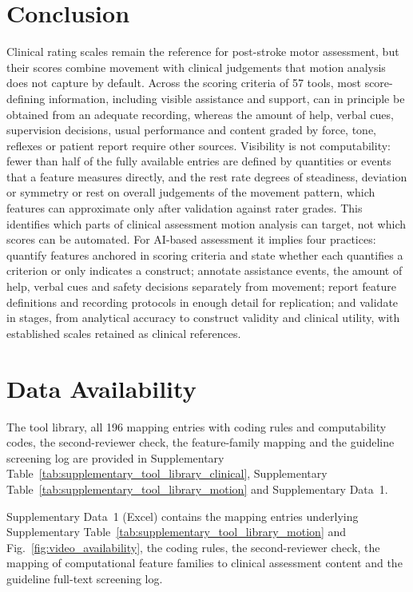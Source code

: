 \documentclass[11pt]{article}
\begin{document}
\section{Conclusion}

Clinical rating scales remain the reference for post-stroke motor assessment, but their scores combine movement with clinical judgements that motion analysis does not capture by default. Across the scoring criteria of 57 tools, most score-defining information, including visible assistance and support, can in principle be obtained from an adequate recording, whereas the amount of help, verbal cues, supervision decisions, usual performance and content graded by force, tone, reflexes or patient report require other sources. Visibility is not computability: fewer than half of the fully available entries are defined by quantities or events that a feature measures directly, and the rest rate degrees of steadiness, deviation or symmetry or rest on overall judgements of the movement pattern, which features can approximate only after validation against rater grades. This identifies which parts of clinical assessment motion analysis can target, not which scores can be automated. For AI-based assessment it implies four practices: quantify features anchored in scoring criteria and state whether each quantifies a criterion or only indicates a construct; annotate assistance events, the amount of help, verbal cues and safety decisions separately from movement; report feature definitions and recording protocols in enough detail for replication; and validate in stages, from analytical accuracy to construct validity and clinical utility, with established scales retained as clinical references.

\section*{Data Availability}
The tool library, all 196 mapping entries with coding rules and computability codes, the second-reviewer check, the feature-family mapping and the guideline screening log are provided in Supplementary Table~\ref{tab:supplementary_tool_library_clinical}, Supplementary Table~\ref{tab:supplementary_tool_library_motion} and Supplementary Data~1.

\printbibliography




\noindent Supplementary Data~1 (Excel) contains the mapping entries underlying Supplementary Table~\ref{tab:supplementary_tool_library_motion} and Fig.~\ref{fig:video_availability}, the coding rules, the second-reviewer check, the mapping of computational feature families to clinical assessment content and the guideline full-text screening log.
\end{document}
